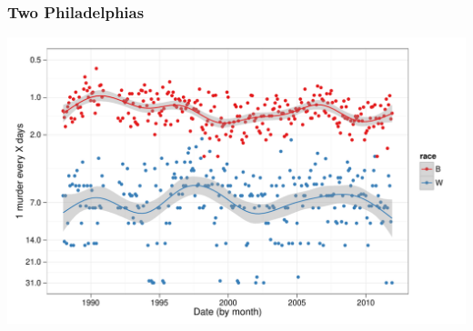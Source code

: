 \documentclass[]{beamer}
\newenvironment{knitrout}{}{} %
\renewenvironment{knitrout}{\begin{footnotesize}}{\end{footnotesize}}
\begin{document}
\begin{frame}[fragile]
\frametitle{Two Philadelphias}




\begin{knitrout}
\color{fgcolor}\includegraphics[width=\linewidth]{figures/murder-unnamed-chunk-9} 
\end{knitrout}

\end{frame}
\end{document}
